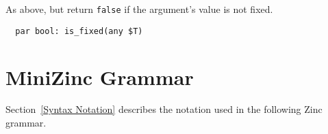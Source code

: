 \documentclass[10pt]{scrartcl}
\newcommand{\ignore}[1]{}
\begin{document}
\builtin{}
As above, but return \texttt{false} if the argument's value is not fixed.
\begin{verbatim}
  par bool: is_fixed(any $T)
\end{verbatim}

\ignore{
\builtin{}
Fold a binary function over an array in a left-associative manner.  For
example, \texttt{foldl('+', 0, xs)} is \texttt{sum}, and
\texttt{foldl('}\verb+/\+\texttt{', true, xs)} is \texttt{forall}.
\begin{verbatim}
  any $T: foldl(any $T:(any $T,any $U), any $T, array[$V] of any $U)
\end{verbatim}

\builtin{}
Fold a binary function over an array in a right-associative manner.
\begin{verbatim}
  any $T: foldr(any $T:(any $U,any $T), any $T, array[$V] of any $U)
\end{verbatim}
}

\clearpage
\section{MiniZinc Grammar}
  \label{Grammar}

Section~\ref{Syntax Notation} describes the notation used in the following
Zinc grammar.

\end{document}
